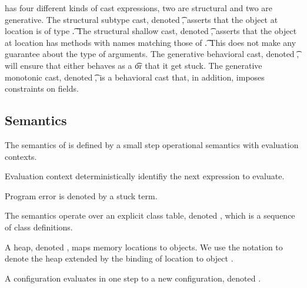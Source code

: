 \documentclass[a4paper,USenglish]{tex/lipics-v2016}
\begin{document}


\name has four different kinds of cast expressions, two are structural and
two are generative. The structural subtype cast, denoted \SubCast\t\a,
asserts that the object at location \a is of type \t.  The structural
shallow cast, denoted \ShaCast\t\a, asserts that the object at location \a
has methods with names matching those of \t. This does not make any
guarantee about the type of arguments.  The generative behavioral cast,
denoted \BehCast\t\a, will ensure that either \a behaves as a \t or that it
get stuck. The generative monotonic cast, denoted \MonCast\t\a, is a
behavioral cast that, in addition, imposes constraints on fields.


\subsection{Semantics}


The semantics of \name is defined by a small step operational semantics with
evaluation contexts.

Evaluation context deterministically identifiy the next expression to evaluate.

Program error is denoted by a stuck term.

The semantics operate over an explicit class table, denoted \K, which is a
sequence of class definitions.

A heap, denoted \s, maps memory locations to
objects. We use the notation \Map\s{\Bind\a{\obj\C{\b\a}}} to denote the
heap \s extended by the binding of location \a to object \obj\C{\b\a}.

A configuration \K\e\s evaluates in one step to a new configuration, denoted
\Reduce \K\e\s \Kp\ep\sp.
\end{document}
